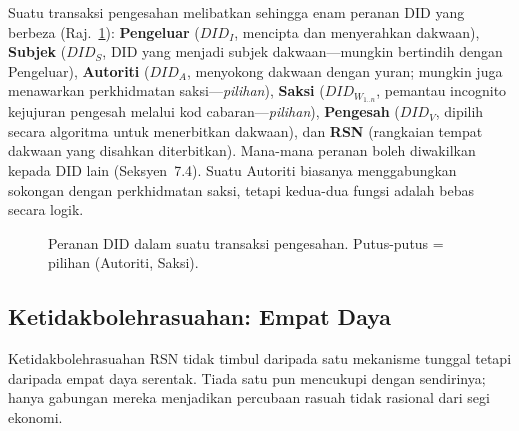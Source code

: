 \documentclass[11pt,a4paper,twocolumn]{article}
\begin{document}
Suatu transaksi pengesahan melibatkan sehingga enam peranan DID yang berbeza (Raj.~\ref{fig:roles}): \textbf{Pengeluar} ($DID_I$, mencipta dan menyerahkan dakwaan), \textbf{Subjek} ($DID_S$, DID yang menjadi subjek dakwaan---mungkin bertindih dengan Pengeluar), \textbf{Autoriti} ($DID_A$, menyokong dakwaan dengan yuran; mungkin juga menawarkan perkhidmatan saksi---\emph{pilihan}), \textbf{Saksi} ($DID_{W_{1..n}}$, pemantau incognito kejujuran pengesah melalui kod cabaran---\emph{pilihan}), \textbf{Pengesah} ($DID_V$, dipilih secara algoritma untuk menerbitkan dakwaan), dan \textbf{RSN} (rangkaian tempat dakwaan yang disahkan diterbitkan). Mana-mana peranan boleh diwakilkan kepada DID lain (Seksyen~7.4). Suatu Autoriti biasanya menggabungkan sokongan dengan perkhidmatan saksi, tetapi kedua-dua fungsi adalah bebas secara logik.

\begin{figure}[ht]
\centering
{}
\caption{Peranan DID dalam suatu transaksi pengesahan. Putus-putus = pilihan (Autoriti, Saksi).}
\label{fig:roles}
\end{figure}

\subsection{Ketidakbolehrasuahan: Empat Daya}

Ketidakbolehrasuahan RSN tidak timbul daripada satu mekanisme tunggal tetapi daripada empat daya serentak. Tiada satu pun mencukupi dengan sendirinya; hanya gabungan mereka menjadikan percubaan rasuah tidak rasional dari segi ekonomi.
\end{document}
